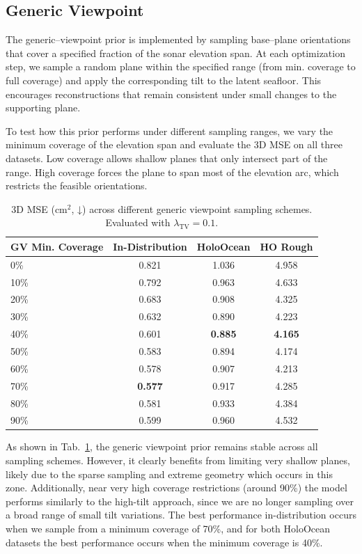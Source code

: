 \subsection{Generic Viewpoint}
\label{sec:gv_ablate}

The generic–viewpoint prior is implemented by sampling base–plane orientations that cover a specified fraction of the sonar elevation span. At each optimization step, we sample a random plane within the specified range (from min. coverage to full coverage) and apply the corresponding tilt to the latent seafloor. This encourages reconstructions that remain consistent under small changes to the supporting plane.

To test how this prior performs under different sampling ranges, we vary the minimum coverage of the elevation span and evaluate the 3D MSE on all three datasets. Low coverage allows shallow planes that only intersect part of the range. High coverage forces the plane to span most of the elevation arc, which  restricts the feasible orientations.

\begin{table}[h]
  \centering
  \caption{\centering
    {3D MSE (cm$^2$, ↓) across different generic viewpoint sampling schemes.}
    Evaluated with \(\lambda_\text{TV}=0.1\).
  }
  \label{tab:gv_ablate}
  \begin{tabular}{@{}lccc@{}}
    \toprule
    GV Min. Coverage &
    In-Distribution &
    HoloOcean &
    HO Rough \\
    \midrule
    0\%  & 0.821 & 1.036 & 4.958 \\
    10\% & 0.792 & 0.963 & 4.633 \\
    20\% & 0.683 & 0.908 & 4.325 \\
    30\% & 0.632 & 0.890 & 4.223 \\
    40\% & 0.601 & \textbf{0.885} & \textbf{4.165} \\
    50\% & 0.583 & 0.894 & 4.174 \\
    60\% & 0.578 & 0.907 & 4.213 \\
    70\% & \textbf{0.577} & 0.917 & 4.285 \\
    80\% & 0.581 & 0.933 & 4.384 \\
    90\% & 0.599 & 0.960 & 4.532 \\
    \bottomrule
  \end{tabular}
\end{table}

As shown in Tab.~\ref{tab:gv_ablate}, the generic viewpoint prior remains stable across all sampling schemes. However, it clearly benefits from limiting very shallow planes, likely due to the sparse sampling and extreme geometry which occurs in this zone. Additionally, near very high coverage restrictions (around 90\%) the model performs similarly to the high-tilt approach, since we are no longer sampling over a broad range of small tilt variations. The best performance in-distribution occurs when we sample from a minimum coverage of 70\%, and for both HoloOcean datasets the best performance occurs when the minimum coverage is 40\%.

